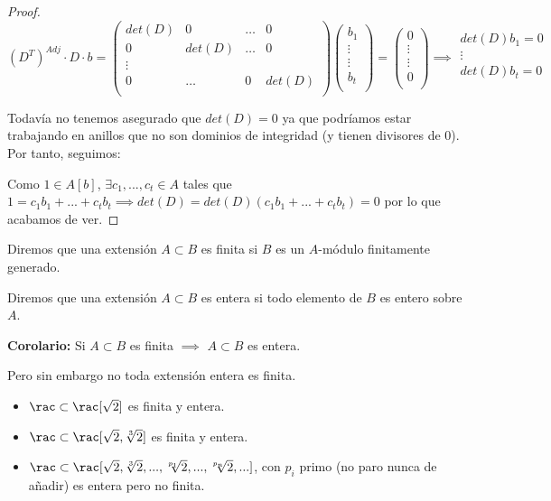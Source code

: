 \begin{proof}
	$$ (D^T)^{Adj}\cdot D \cdot b = \left( \begin{array}{cccc}
	det(D) & 0 & \dots & 0 \\
	0 & det(D) & \dots & 0 \\
	\vdots &  & &  \\
	0 & \dots & 0 & det(D)\\
	\end{array}
	\right) \left( \begin{array}{c}
	b_1 \\
	\vdots \\
	\vdots \\
	b_t\\
	\end{array}
	\right) =
	\left( \begin{array}{c}
	0 \\
	\vdots\\
	\vdots \\
	0\\
	\end{array}
	\right) \implies
	\begin{array}{c}
	det(D)b_1=0 \\
	\vdots\\
	det(D)b_t=0\\
	\end{array}
$$

Todavía no tenemos asegurado que $det(D)=0$ ya que podríamos estar trabajando en anillos que no son dominios de integridad (y tienen divisores de 0). Por tanto, seguimos:

	 Como $1 \in A[b]$, $\exists c_1,...,c_t \in A$ tales que $1=c_1b_1+...+c_tb_t \implies det(D)=det(D)(c_1b_1+...+c_tb_t)=0$ por lo que acabamos de ver.
\end{proof}

\begin{defn}
	Diremos que una extensión $A \subset B$ es finita si $B$ es un $A$-módulo finitamente generado.
\end{defn}

\begin{defn}
	Diremos que una extensión $A \subset B$ es entera si todo elemento de $B$ es entero sobre $A$.
\end{defn}

\textbf{Corolario:} Si $A\subset B$ es finita $\implies$ $A \subset B$ es entera.

Pero sin embargo no toda extensión entera es finita.
\begin{example}
	\begin{itemize}
		\item $\rac \subset \rac[\sqrt{2}]$ es finita y entera.
		\item $\rac \subset \rac[\sqrt{2}, \sqrt[3]{2}]$ es finita y entera.
		\item $\rac \subset \rac[\sqrt{2}, \sqrt[3]{2},..., \sqrt[p_1]{2},...,\sqrt[p_n]{2},...]$, con $p_i$ primo (no paro nunca de añadir) es entera pero no finita.
	\end{itemize}
\end{example}

